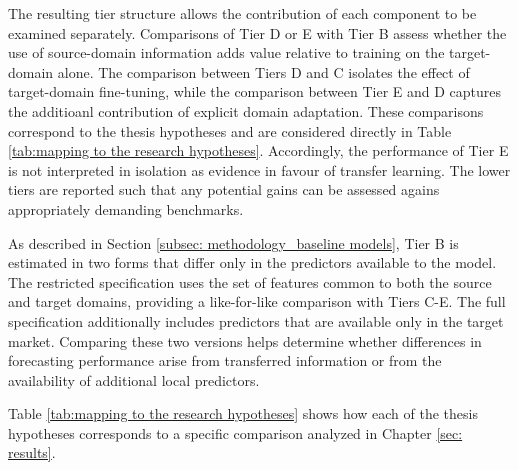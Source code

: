 \noindent The resulting tier structure allows the contribution of each component to be examined separately. Comparisons of Tier D or E with Tier B assess whether the use of source-domain information adds value relative to training on the target-domain alone. The comparison between Tiers D and C isolates the effect of target-domain fine-tuning, while the comparison between Tier E and D captures the additioanl contribution of explicit domain adaptation. These comparisons correspond to the thesis hypotheses and are considered directly in Table \ref{tab:mapping to the research hypotheses}. Accordingly, the performance of Tier E is not interpreted in isolation as evidence in favour of transfer learning. The lower tiers are reported such that any potential gains can be assessed agains appropriately demanding benchmarks.

As described in Section \ref{subsec: methodology_baseline models}, Tier B is estimated in two forms that differ only in the predictors available to the model. The restricted specification uses the set of features common to both the source and target domains, providing a like-for-like comparison with Tiers C-E. The full specification additionally includes predictors that are available only in the target market. Comparing these two versions helps determine whether differences in forecasting performance arise from transferred information or from the availability of additional local predictors. 

Table \ref{tab:mapping to the research hypotheses} shows how each of the thesis hypotheses corresponds to a specific comparison analyzed in Chapter \ref{sec: results}.



